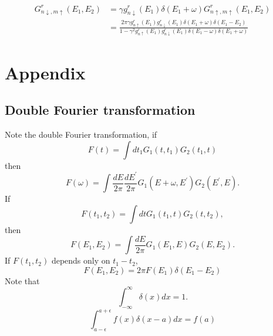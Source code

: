 \documentclass[11pt,a4paper]{article}
\begin{document}
\begin{equation}
\begin{split}
G_{n \downarrow, m \uparrow}^{r}\left(E_{1}, E_{2}\right) &= \gamma g_{n \downarrow}^{r} \left(E_{1}\right) \delta(E_{1}+\omega) G_{n \uparrow, m \uparrow}^{r}(E_{1},E_{2}) \\
&=\frac{2 \pi\gamma g_{n \uparrow}^{r}\left(E_{1}\right) g_{n \downarrow}^{r} \left(E_{1}\right) \delta(E_{1}+\omega)  \delta\left(E_{1}-E_{2} \right) }{1-\gamma^{2} g_{n \uparrow}^{r}\left(E_{1}\right) g_{n \downarrow}^{r}\left(E_{1}\right) \delta(E_{1}-\omega)\delta(E_{1}+\omega)}
\end{split}
\end{equation}






\section{Appendix}
\subsection{Double Fourier transformation}
Note the double Fourier transformation, if
\begin{equation}
F(t)=\int d t_{1} G_{1}\left(t, t_{1}\right) G_{2}\left(t_{1}, t\right)
\end{equation}
then
\begin{equation}
F(\omega)=\int \frac{d E}{2 \pi} \frac{d E^{\prime}}{2 \pi} G_{1}\left(E+\omega, E^{\prime}\right) G_{2}\left(E^{\prime}, E\right).
\end{equation}
If
\begin{equation}
F\left(t_{1}, t_{2}\right)=\int d t G_{1}\left(t_{1}, t\right) G_{2}\left(t, t_{2}\right),
\end{equation}
then
\begin{equation}
F\left(E_{1}, E_{2}\right)=\int\frac{d E}{2\pi} G_{1}\left(E_{1}, E\right) G_{2}\left(E, E_{2}\right).
\end{equation}
If $F(t_{1}, t_{2})$ depends only on $t_{1}-t_{2}$,
\begin{equation}
F\left(E_{1}, E_{2}\right)=2\pi F\left(E_{1}\right)\delta(E_{1}-E_{2})
\end{equation}
Note that
\begin{equation}
\int_{-\infty}^{\infty} \delta(x) d x=1.
\end{equation}
\begin{equation}
\int_{a-\epsilon}^{a+\epsilon} f(x) \delta(x-a) d x=f(a)
\end{equation}
\end{document}
